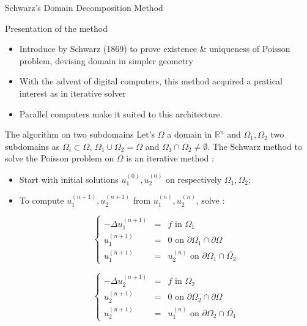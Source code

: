\documentclass[compress,10pt,aspectratio=169]{beamer}
\begin{document}
\begin{frame}{Schwarz's Domain Decomposition Method}
  \scriptsize
  \begin{block}{\small Presentation of the method}
    \begin{itemize}
      \item Introduce by Schwarz (1869) to prove existence \& uniqueness of Poisson problem, devising domain
            in simpler geometry
      \item With the advent of digital computers, this method acquired a pratical interest as in iterative solver
      \item Parallel computers make it suited to this architecture.
    \end{itemize}
  \end{block}

  \begin{exampleblock}{The algorithm on two subdomains}
    Let's $\Omega$ a domain in $\mathbb{R}^{n}$ and $\Omega_{1},\Omega_{2}$ two subdomains as $\Omega_{i}\subset \Omega$,
    $\Omega_{1}\cup \Omega_{2} = \Omega$ and $\Omega_{1}\cap \Omega_{2} \neq \emptyset$. The Schwarz method to solve the
    Poisson problem on $\Omega$ is an iterative method :
    \begin{itemize}
      \item Start with initial solutions $u^{(0)}_{1},u^{(0)}_{2}$ on respectively $\Omega_{1}, \Omega_{2}$;
      \item To compute $u^{(n+1)}_{1}, u^{(n+1)}_{2}$ from $u^{(n)}_{1}, u^{(n)}_{2}$, solve :
      \vspace*{-5mm}
      \begin{multicols}{2}
        \[
          \left\{
            \begin{array}{lcl}
              -\Delta u_{1}^{(n+1)} & = & f \mbox{ in }\Omega_{1}\\
              u_{1}^{(n+1)} & = & 0 \mbox{ on } \partial\Omega_{1} \cap \partial \Omega \\
              u_{1}^{(n+1)} & = & u_{2}^{(n)} \mbox{ on } \partial\Omega_{1} \cap  \overline{\Omega_{2}}
            \end{array}
          \right.
        \]

        \[
          \left\{
            \begin{array}{lcl}
              -\Delta u_{2}^{(n+1)} & = & f \mbox{ in }\Omega_{2}\\
              u_{2}^{(n+1)} & = & 0 \mbox{ on } \partial\Omega_{2} \cap \partial\Omega \\
              u_{2}^{(n+1)} & = & u_{1}^{(n)} \mbox{ on } \partial\Omega_{2} \cap \overline{\Omega_{1}}
            \end{array}
          \right.
        \]
      \end{multicols}
    \end{itemize}
  \end{exampleblock}
\end{frame}
\end{document}
